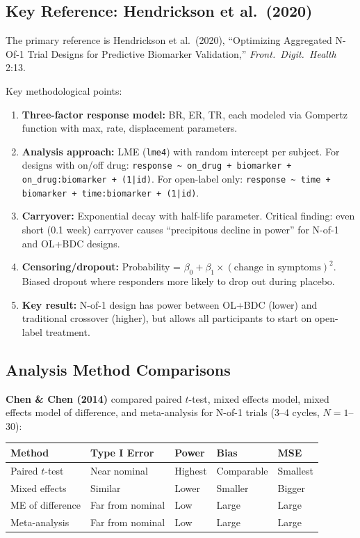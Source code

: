 \documentclass[11pt,letterpaper]{article}
\begin{document}
\subsection{Key Reference: Hendrickson et al.\ (2020)}

The primary reference is Hendrickson et al.\ (2020), ``Optimizing
Aggregated N-Of-1 Trial Designs for Predictive Biomarker Validation,''
\textit{Front.\ Digit.\ Health} 2:13.

Key methodological points:
\begin{enumerate}[nosep]
\item \textbf{Three-factor response model:} BR, ER, TR, each modeled
  via Gompertz function with max, rate, displacement parameters.
\item \textbf{Analysis approach:} LME (\texttt{lme4}) with random
  intercept per subject. For designs with on/off drug:
  \texttt{response \textasciitilde{} on\_drug + biomarker +
  on\_drug:biomarker + (1|id)}. For open-label only:
  \texttt{response \textasciitilde{} time + biomarker +
  time:biomarker + (1|id)}.
\item \textbf{Carryover:} Exponential decay with half-life parameter.
  Critical finding: even short (0.1 week) carryover causes
  ``precipitous decline in power'' for N-of-1 and OL+BDC designs.
\item \textbf{Censoring/dropout:} Probability =
  $\beta_0 + \beta_1 \times (\text{change in symptoms})^2$. Biased
  dropout where responders more likely to drop out during placebo.
\item \textbf{Key result:} N-of-1 design has power between OL+BDC
  (lower) and traditional crossover (higher), but allows all
  participants to start on open-label treatment.
\end{enumerate}

\subsection{Analysis Method Comparisons}

\textbf{Chen \& Chen (2014)} compared paired $t$-test, mixed effects
model, mixed effects model of difference, and meta-analysis for N-of-1
trials (3--4 cycles, $N = 1$--30):

\begin{table}[h]
\centering
\begin{tabular}{@{}lllll@{}}
\toprule
Method & Type I Error & Power & Bias & MSE \\
\midrule
Paired $t$-test & Near nominal & Highest & Comparable & Smallest \\
Mixed effects & Similar & Lower & Smaller & Bigger \\
ME of difference & Far from nominal & Low & Large & Large \\
Meta-analysis & Far from nominal & Low & Large & Large \\
\bottomrule
\end{tabular}
\end{table}
\end{document}
